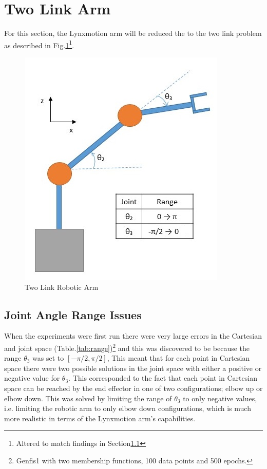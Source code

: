 \documentclass[11.5pt, twoside, a4paper]{article}
\begin{document}
\section{Two Link Arm} %

For this section, the Lynxmotion arm will be reduced the to the two link problem as described in Fig.\ref{fig:2Link}\footnote{Altered to match findings in Section\ref{sec:elbowIssues}}. 

\begin{figure} %
\begin{center}
\includegraphics{2Link.jpg}
\caption{Two Link Robotic Arm \label{fig:2Link}}
\end{center}
\end{figure}

\subsection{Joint Angle Range Issues} \label{sec:elbowIssues}

When the experiments were first run there were very large errors in the Cartesian and joint space (Table.\ref{tab:range})\footnote{Genfis1 with two membership functions, 100 data points and 500 epochs.} and this was discovered to be because the range $\theta_3$ was set to $\left[-\pi/2,\pi/2\right]$, This meant that for each point in Cartesian space there were two possible solutions in the joint space with either a positive or negative value for $\theta_3$. This corresponded to the fact that each point in Cartesian space can be reached by the end effector in one of two configurations; elbow up or elbow down. This was solved by limiting the range of $\theta_3$ to only negative values, i.e. limiting the robotic arm to only elbow down configurations, which is much more realistic in terms of the Lynxmotion arm's capabilities.
\end{document}
